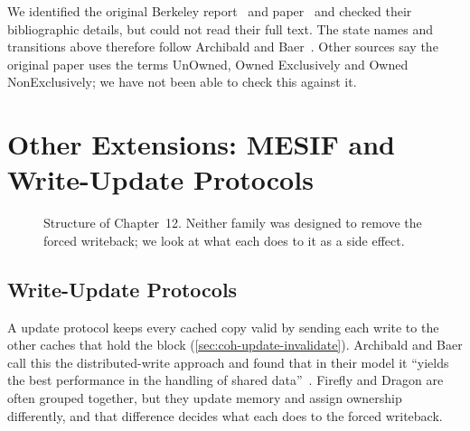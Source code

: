 \begin{remarkbox}
We identified the original Berkeley report~\cite{katz1984implementing} and
paper~\cite{katz1985implementing} and checked their bibliographic details, but
could not read their full text. The state names and transitions above therefore
follow Archibald and Baer~\cite{archibald1986evaluation}. Other sources say the
original paper uses the terms UnOwned, Owned Exclusively and Owned NonExclusively;
we have not been able to check this against it.
\end{remarkbox}

\chapter{Other Extensions: MESIF and Write-Update Protocols}
\label{ch:other-ext}
%

\begin{figure}[htbp]
\centering
{}
\caption[]{Structure of Chapter~12. Neither family was
designed to remove the forced writeback; we look at what each does to it as a side
effect.}
\label{fig:ch12-map}
\end{figure}

\section{Write-Update Protocols}
\label{sec:ext-update}
%

A \gls{update} protocol keeps every cached copy valid by sending each write to the
other caches that hold the block (\cref{sec:coh-update-invalidate}). Archibald and
Baer call this the distributed-write approach and found that in their model it
``yields the best performance in the handling of shared
data''~\cite[p.~294]{archibald1986evaluation}. Firefly and Dragon are often
grouped together, but they update memory and assign ownership differently, and
that difference decides what each does to the forced writeback.

